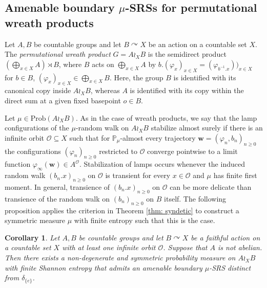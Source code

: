 \documentclass[reqno,a4paper,11pt]{amsart}
\numberwithin{equation}{section}
\newcommand{\1}{\mathbf{1}}
\def\P{{\mathbb P}}
\def\cO{{\mathcal O}}
\newtheorem{cor}[teo]{Corollary}
\theoremstyle{definition}
\begin{document}
	
	\subsection{Amenable boundary $\mu$-SRSs for permutational wreath products}
	Let $A, B$ be countable groups and let $B \curvearrowright X$ be an action on a countable set $X$. The \emph{permutational wreath product} $G = A \wr_X B$ is the semidirect product $\left(\bigoplus_{x \in X} A\right) \rtimes B$, where $B$ acts on $\bigoplus_{x \in X} A$ by $b.(\varphi_x)_{x \in X} = (\varphi_{b^{-1}.x}))_{x \in X}$ for $b \in B$, $(\varphi_x)_{x \in X} \in \bigoplus_{x \in X}B$. Here, the group $B$ is identified with its canonical copy inside $A\wr_X B$, whereas $A$ is identified with its copy within the direct sum at a given fixed basepoint $o\in B$.
	
	Let $\mu \in \mathrm{Prob}(A \wr_X B)$. As in the case of wreath products, we say that the lamp configurations of the $\mu$-random walk on $A \wr_X B$ stabilize almost surely if there is an infinite orbit $\cO \subseteq X$ such that for $\P_{\mu}$-almost every trajectory $\mathbf{w} = (\varphi_n, b_n)_{n\geq 0}$ the configurations $(\varphi_n)_{n \geq 0}$ restricted to $\cO$ converge pointwise to a limit function $\varphi_\infty(\mathbf{w}) \in A^\cO$. 
	Stabilization of lamps occurs whenever the induced random walk $(b_n.x)_{n \geq 0}$ on $\cO$ is transient for every $x \in \cO$ and $\mu$ has finite first moment. In general, transience of $(b_n.x)_{n \geq 0}$ on $\cO$ can be more delicate than transience of the random walk on $(b_n)_{n \geq 0}$ on $B$ itself. The following proposition applies the criterion in Theorem \ref{thm: syndetic} to construct a symmetric measure $\mu$ with finite entropy such that this is the case.
	
	\begin{cor}\label{cor: permutational wreath products}
		Let $A, B$ be countable groups and let $B \curvearrowright X$ be a faithful action on a countable set $X$ with at least one infinite orbit $\cO$. Suppose that $A$ is not abelian. Then there exists a non-degenerate and symmetric probability measure on $A\wr_X B$ with finite Shannon entropy that admits an amenable boundary $\mu$-SRS distinct from $\delta_{\{e\}}$.
	\end{cor}
	
\end{document}
